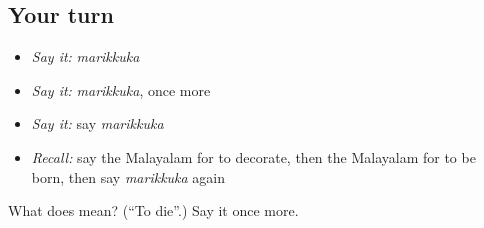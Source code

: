 \subsection*{Your turn}
\begin{itemize}
\raggedright
  \item \emph{Say it:} \emph{marikkuka}
  \item \emph{Say it:} \emph{marikkuka}, once more
  \item \emph{Say it:} say \emph{marikkuka}
  \item \emph{Recall:} say the Malayalam for to decorate, then the Malayalam for to be born, then say \emph{marikkuka} again
\end{itemize}

\begin{tcolorbox}[breakable,colback=teal!4,colframe=teal!35!black,title={Before you move on}]
What does  mean? (\textquotedblleft{}To die\textquotedblright{}.) Say it once more.
\end{tcolorbox}
